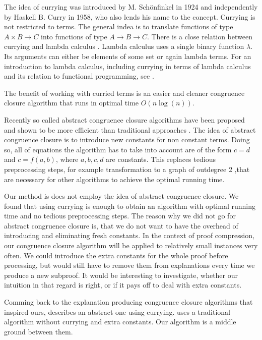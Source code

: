 The idea of currying was introduced by M. Sch\"onfinkel \cite{Schoenfinkel1924} in 1924 and independently by Haskell B. Curry \cite{Curry1958} in 1958, who also lends his name to the concept.
Currying is not restricted to terms.
The general indea is to translate functions of type $A \times B \rightarrow C$ into functions of type $A \rightarrow B \rightarrow C$.
There is a close relation between currying and lambda calculus \cite{Church1936}.
Lambda calculus uses a single binary function $\lambda$.
Its arguments can either be elements of some set or again lambda terms.
For an introduction to lambda calculus, including currying in terms of lambda calculus and its relation to functional programming, see \cite{Barendregt1997}.

The benefit of working with curried terms is an easier and cleaner congruence closure algorithm that runs in optimal time $O(n \log(n))$.

Recently so called abstract congruence closure algorithms have been proposed and shown to be more efficient than traditional approaches \cite{Bachmair2000}.
The idea of abstract congruence closure is to introduce new constants for non constant terms.
Doing so, all of equations the algorithm has to take into account are of the form $c = d$ and $c = f(a,b)$, where $a,b,c,d$ are constants.
This replaces tedious preprocessing steps, for example transformation to a graph of outdegree 2 \cite{Downey1980},that are necessary for other algorithms to achieve the optimal running time.

Our method is does not employ the idea of abstract congruence closure.
We found that using currying is enough to obtain an algorithm with optimal running time and no tedious preprocessing steps.
The reason why we did not go for abstract congruence closure is, that we do not want to have the overhead of introducing and eliminating fresh constants.
In the context of proof compression, our congruence closure algorithm will be applied to relatively small instances very often.
We could introduce the extra constants for the whole proof before processing, but would still have to remove them from explanations every time we produce a new subproof.
It would be interesting to investigate, whether our intuition in that regard is right, or if it pays off to deal with extra constants.

Comming back to the explanation producing congruence closure algorithms that inspired ours, \cite{Nieuwenhuis2005,Nieuwenhuis2007} describes an abstract one using currying.
\cite{Fontaine2004} uses a traditional algorithm without currying and extra constants.
Our algorithm is a middle ground between them.


